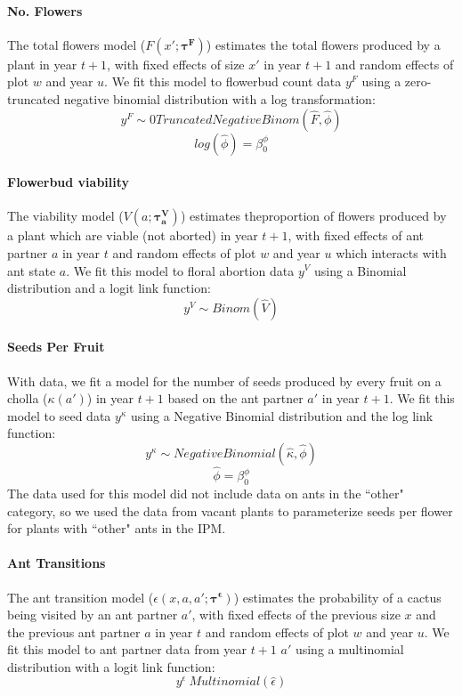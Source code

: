 \documentclass[11pt]{article}
\begin{document}
	
	\paragraph{No. Flowers}
	The total flowers model ($F(x';\pmb{\tau^{F}})$) estimates the total flowers produced by a plant in year $t+1$, with fixed effects of size $x'$ in year $t+1$ and random effects of plot $w$ and year $u$. 
	We fit this model to flowerbud count data $y^F$ using a zero-truncated negative binomial distribution with a log transformation:
	$$y^{F} \sim 0 Truncated Negative Binom(\hat{F},\hat{\phi})$$
	$$log(\hat{\phi}) = \beta_{0}^{\phi}$$
	
	
	\paragraph{Flowerbud viability}
	The viability model ($V(a;\pmb{\tau^{V}_{a}})$) estimates theproportion of flowers produced by a plant which are viable (not aborted) in year $t+1$, with fixed effects of ant partner $a$ in year $t$ and random effects of plot $w$ and year $u$ which interacts with ant state $a$.
	We fit this model to floral abortion data $y^V$ using a Binomial distribution and a logit link function:
	$$y^{V} \sim Binom(\hat{V})$$
	
	
	\paragraph{Seeds Per Fruit}
	With data\cite{Miller2006}, we fit a model for the number of seeds produced by every fruit on a cholla ($\kappa(a')$) in year $t+1$ based on the ant partner $a'$ in year $t+1$.
	We fit this model to seed data $y^{\kappa}$ using a Negative Binomial distribution and the log link function: 
	$$y^{\kappa} \sim  Negative Binomial(\hat{\kappa},\hat{\phi})$$
	$$\hat{\phi} = \beta_{0}^{\phi}$$
	The data used for this model did not include data on ants in the ``other" category, so we used the data from vacant plants to parameterize seeds per flower for plants with ``other" ants in the IPM.
	
	\paragraph{Ant Transitions}
	The ant transition model ($\epsilon(x,a,a';\pmb{\tau^{\epsilon}})$) estimates the probability of a cactus being visited by an ant partner $a'$, with fixed effects of the previous size $x$  and the previous ant partner $a$  in year $t$ and random effects of plot $w$ and year $u$.
	We fit this model to ant partner data from year $t+1$ $a'$ using a multinomial distribution with a logit link function: 
	$$y^{\epsilon} ~ Multinomial(\hat{\epsilon})$$
	
\end{document}
